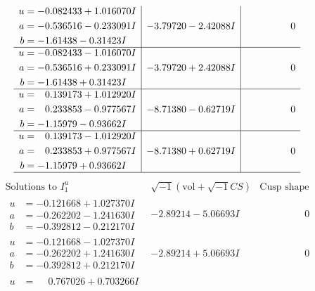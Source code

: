 \documentclass[1p]{elsarticle_modified}
\theoremstyle{definition}
\newcommand{\I}{\sqrt{-1}}
\begin{document}
$$\begin{array}{c|c|c}
\begin{aligned}
u &= -0.082433 + 1.016070 I \\
a &= -0.536516 - 0.233091 I \\
b &= -1.61438 - 0.31423 I\end{aligned}
 & -3.79720 - 2.42088 I & \phantom{-0.000000 } 0 \\ \hline\begin{aligned}
u &= -0.082433 - 1.016070 I \\
a &= -0.536516 + 0.233091 I \\
b &= -1.61438 + 0.31423 I\end{aligned}
 & -3.79720 + 2.42088 I & \phantom{-0.000000 } 0 \\ \hline\begin{aligned}
u &= \phantom{-}0.139173 + 1.012920 I \\
a &= \phantom{-}0.233853 - 0.977567 I \\
b &= -1.15979 - 0.93662 I\end{aligned}
 & -8.71380 - 0.62719 I & \phantom{-0.000000 } 0 \\ \hline\begin{aligned}
u &= \phantom{-}0.139173 - 1.012920 I \\
a &= \phantom{-}0.233853 + 0.977567 I \\
b &= -1.15979 + 0.93662 I\end{aligned}
 & -8.71380 + 0.62719 I & \phantom{-0.000000 } 0\\
 \hline 
 \end{array}$$\newpage$$\begin{array}{c|c|c}  
\text{Solutions to }I^u_{1}& \I (\text{vol} + \sqrt{-1}CS) & \text{Cusp shape}\\
 \hline 
\begin{aligned}
u &= -0.121668 + 1.027370 I \\
a &= -0.262202 - 1.241630 I \\
b &= -0.392812 - 0.212170 I\end{aligned}
 & -2.89214 - 5.06693 I & \phantom{-0.000000 } 0 \\ \hline\begin{aligned}
u &= -0.121668 - 1.027370 I \\
a &= -0.262202 + 1.241630 I \\
b &= -0.392812 + 0.212170 I\end{aligned}
 & -2.89214 + 5.06693 I & \phantom{-0.000000 } 0 \\ \hline\begin{aligned}
u &= \phantom{-}0.767026 + 0.703266 I \\

\end{aligned}
\end{array}$$
\end{document}
